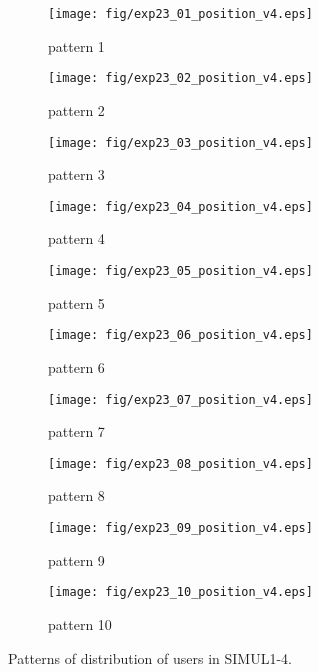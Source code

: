 	\begin{figure}
		\begin{center}
			\begin{subfigure}[b]{0.32\textwidth}
				\texttt{[image: fig/exp23\_01\_position\_v4.eps]}
				\caption{pattern 1}
				\label{figure:simul1_4_a}
			\end{subfigure}
			\begin{subfigure}[b]{0.32\textwidth}
				\texttt{[image: fig/exp23\_02\_position\_v4.eps]}
				\caption{pattern 2}
				\label{figure:simul1_4_b}
			\end{subfigure}
			\begin{subfigure}[b]{0.32\textwidth}
				\texttt{[image: fig/exp23\_03\_position\_v4.eps]}
				\caption{pattern 3}
				\label{figure:simul1_4_c}
			\end{subfigure}
			\begin{subfigure}[b]{0.32\textwidth}
				\texttt{[image: fig/exp23\_04\_position\_v4.eps]}
				\caption{pattern 4}
				\label{figure:simul1_4_d}
			\end{subfigure}
			\begin{subfigure}[b]{0.32\textwidth}
				\texttt{[image: fig/exp23\_05\_position\_v4.eps]}
				\caption{pattern 5}
				\label{figure:simul1_4_e}
			\end{subfigure}
			\begin{subfigure}[b]{0.32\textwidth}
				\texttt{[image: fig/exp23\_06\_position\_v4.eps]}
				\caption{pattern 6}
				\label{figure:simul1_4_f}
			\end{subfigure}
			\begin{subfigure}[b]{0.32\textwidth}
				\texttt{[image: fig/exp23\_07\_position\_v4.eps]}
				\caption{pattern 7}
				\label{figure:simul1_4_g}
			\end{subfigure}
			\begin{subfigure}[b]{0.32\textwidth}
				\texttt{[image: fig/exp23\_08\_position\_v4.eps]}
				\caption{pattern 8}
				\label{figure:simul1_4_h}
			\end{subfigure}
			\begin{subfigure}[b]{0.32\textwidth}
				\texttt{[image: fig/exp23\_09\_position\_v4.eps]}
				\caption{pattern 9}
				\label{figure:simul1_4_i}
			\end{subfigure}
			\begin{subfigure}[b]{0.32\textwidth}
				\texttt{[image: fig/exp23\_10\_position\_v4.eps]}
				\caption{pattern 10}
				\label{figure:simul1_4_j}
			\end{subfigure}
			\caption{Patterns of distribution of users in SIMUL1-4.}
			\label{figure:simul1_4_p}
		\end{center}
	\end{figure}
	
